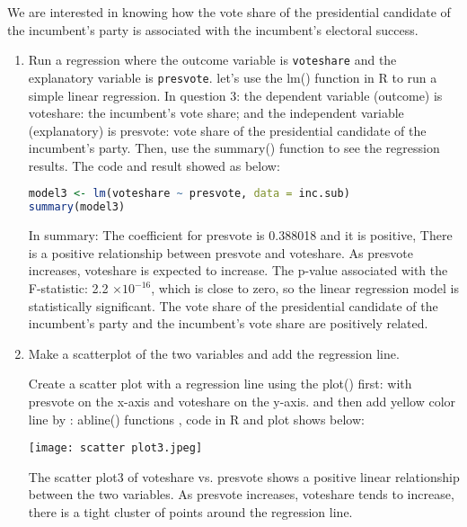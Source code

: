 \documentclass[12pt,letterpaper]{article}
\begin{document}
\noindent We are interested in knowing how the vote share of the presidential candidate of the incumbent's party is associated with the incumbent's electoral success.
	\vspace{.25cm}
	\begin{enumerate}
		\item Run a regression where the outcome variable is \texttt{voteshare} and the explanatory variable is \texttt{presvote}.
			\vspace{1cm}
\noindent let's use the lm() function in R  to run a simple linear 
           regression. In question 3: the dependent variable (outcome) is voteshare: the incumbent’s vote share; and the independent variable (explanatory) is presvote: vote share of the presidential candidate of the incumbent’s party. Then, use the summary() function to see the regression results. The code  and result showed as below:  

  \begin{lstlisting}[language=R] 
model3 <- lm(voteshare ~ presvote, data = inc.sub)
summary(model3)
 \end{lstlisting} 


\noindent In summary: The coefficient for presvote is 0.388018 and it is positive, There is a positive relationship between presvote and voteshare. As presvote increases, voteshare is expected to increase. The p-value associated with the F-statistic: 2.2 $\times 10^{-16}$,  
which is close to zero, so the linear regression model is statistically significant. The vote share of the presidential candidate of the incumbent’s party and the incumbent’s vote share are positively related. 
\newpage
   
		\item Make a scatterplot of the two variables and add the regression line. 

\vspace{2cm}

  Create a scatter plot with a regression line using the plot() first:  with presvote on the x-axis and voteshare on the y-axis.  and  then add  yellow color line by : abline() functions , code in R and plot shows below:

 \texttt{[image: scatter plot3.jpeg]} 
 
The scatter plot3  of voteshare vs. presvote shows a positive linear relationship between the two variables. As presvote increases, voteshare tends to increase, there is a tight cluster of points around the regression line.


\end{enumerate}
\end{document}
